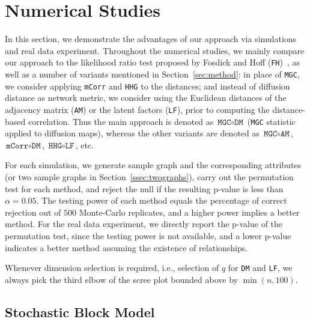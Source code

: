 \documentclass[12pt]{article}
\theoremstyle{definition}
\begin{document}
	
	\section{Numerical Studies}
	\label{sec:simulation}
	
	In this section, we demonstrate the advantages of our approach via simulations and real data experiment. Throughout the numerical studies, we mainly compare our approach to the likelihood ratio test proposed by Fosdick and Hoff (\texttt{FH})~\citep{fosdick2015testing}, as well as a number of variants mentioned in Section~\ref{sec:method}: in place of \texttt{MGC}, we consider applying \texttt{mCorr} and \texttt{HHG} to the distances; and instead of diffusion distance as network metric, we consider using the Euclidean distances of the adjacency matrix (\texttt{AM}) or the latent factors (\texttt{LF}), prior to computing the distance-based correlation. Thus the main approach is denoted as $\texttt{MGC} \circ \texttt{DM}$ (\texttt{MGC} statistic applied to diffusion maps), whereas the other variants are denoted as $\texttt{MGC} \circ \texttt{AM}$, $\texttt{mCorr} \circ \texttt{DM}$, $\texttt{HHG} \circ \texttt{LF}$, etc. 
	
	For each simulation, we generate sample graph and the corresponding attributes (or two sample graphs in Section~\ref{ssec:twographs}), carry out the permutation test for each method, and reject the null if the resulting p-value is less than $\alpha = 0.05$. The testing power of each method equals the percentage of correct rejection out of $500$ Monte-Carlo replicates, and a higher power implies a better method. For the real data experiment, we directly report the p-value of the permutation test, since the testing power is not available, and a lower p-value indicates a better method assuming the existence of relationships. 
	
	Whenever dimension selection is required, i.e., selection of $q$ for \texttt{DM} and \texttt{LF}, we always pick the third elbow of the scree plot bounded above by $\min(n, 100)$. 
	
	\subsection{Stochastic Block Model}
	
\end{document}
